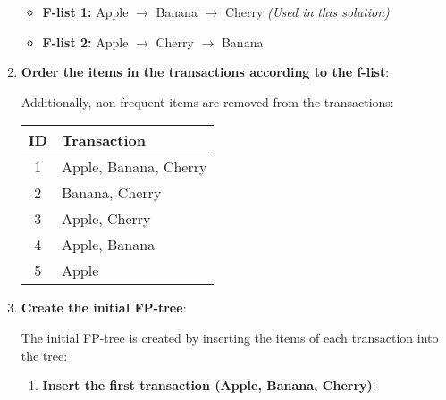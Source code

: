 \documentclass[
english,
smallborders
]{i6prcsht}
\begin{document}
\begin{solution}
\begin{enumerate}
		      \begin{itemize}
			      \item \textbf{F-list 1:} Apple $\rightarrow$ Banana $\rightarrow$ Cherry \textit{(Used in this solution)}
			      \item \textbf{F-list 2:} Apple $\rightarrow$ Cherry $\rightarrow$ Banana
		      \end{itemize}

		\item \textbf{Order the items in the transactions according to the f-list}:

		      Additionally, non frequent items are removed from the transactions:

		      \begin{center}
			      \begin{tabular}{|c|l|}
				      \hline
				      \textbf{ID} & \textbf{Transaction}  \\
				      \hline
				      1           & Apple, Banana, Cherry \\
				      \hline
				      2           & Banana, Cherry        \\
				      \hline
				      3           & Apple, Cherry         \\
				      \hline
				      4           & Apple, Banana         \\
				      \hline
				      5           & Apple                 \\
				      \hline
			      \end{tabular}
		      \end{center}

		      \newpage

		\item \textbf{Create the initial FP-tree}:

		      The initial FP-tree is created by inserting the items of each transaction into the tree:

		      \begin{enumerate}
			      \item \textbf{Insert the first transaction (Apple, Banana, Cherry)}:

			            \begin{center}
\end{center}
\end{enumerate}
\end{enumerate}
\end{solution}
\end{document}
